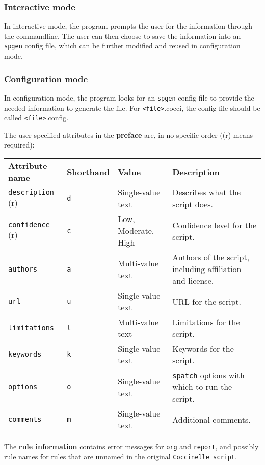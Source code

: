 \subsubsection{Interactive mode\label{interact}}
In interactive mode, the program prompts the user for the information through the commandline. The user can then choose to save the information into an \texttt{spgen} config file, which can be further modified and reused in configuration mode.
\bigskip

\subsubsection{Configuration mode\label{config}}
In configuration mode, the program looks for an \texttt{spgen} config file to provide the needed information to generate the file. For \texttt{<file>}.cocci, the config file should be called \texttt{<file>}.config.

The user-specified attributes in the \textbf{preface} are, in no specific order ((r) means required):
\begin{center}
\renewcommand{\arraystretch}{1.2}
\begin{tabular}{p{3cm}p{2.1cm}p{3.6cm}p{5.5cm}}

\textbf{Attribute name} & \textbf{Shorthand} & \textbf{Value} & \textbf{Description}\\

\texttt{description} (r) & \texttt{d} & Single-value text & Describes what the script does.\\

\texttt{confidence} (r) & \texttt{c} & Low, Moderate, High & Confidence level for the script.\\

\texttt{authors} & \texttt{a} & Multi-value text & Authors of the script, including affiliation and license.\\

\texttt{url} & \texttt{u} & Single-value text & URL for the script.\\

\texttt{limitations} & \texttt{l} & Multi-value text & Limitations for the script.\\

\texttt{keywords} & \texttt{k} & Single-value text & Keywords for the script.\\

\texttt{options} & \texttt{o} & Single-value text &\texttt{spatch} options with which to run the script.\\

\texttt{comments} & \texttt{m} & Single-value text & Additional comments.\\
\end{tabular}
\end{center}\vspace{0.5cm}
The \textbf{rule information} contains error messages for \texttt{org} and \texttt{report}, and possibly rule names for rules that are unnamed in the original \texttt{Coccinelle script}.

